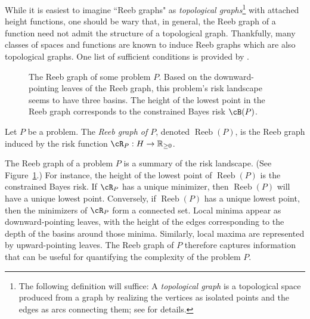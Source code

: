 \documentclass[twoside,11pt]{article}
\DeclareMathOperator{\reeb}{Reeb}
\begin{document}
    While it is easiest to imagine ``Reeb graphs" as \emph{topological graphs}\footnote{The following definition will suffice: A \emph{topological graph} is a topological space produced from a graph by realizing the vertices as isolated points and the edges as arcs connecting them; see \citep[Chapter 0]{hatcher2005algebraic} for details.} with attached height functions, one should be wary that, in general, the Reeb graph of a function need not admit the structure of a topological graph. Thankfully, many classes of spaces and functions are known to induce Reeb graphs which are also topological graphs. One list of sufficient conditions is provided by \citet[Example 2.2]{deSilva2016}.
   
    
    
    
   

    \begin{figure}
        \centering
        \caption{The Reeb graph of some problem $P$. Based on the downward-pointing leaves of the Reeb graph, this problem's risk landscape seems to have three basins. The height of the lowest point in the Reeb graph corresponds to the constrained Bayes risk $\cB(P)$.}\label{fig:problem-reeb-space}
    \end{figure}

    \begin{definition}
        Let $P$ be a problem. The \emph{Reeb graph of $P$}, denoted $\reeb(P)$, is the Reeb graph induced by the risk function $\cR_P:H\to \mathbb R_{\geq 0}$.
    \end{definition}

    The Reeb graph of a problem $P$ is a summary of the risk landscape. (See Figure~\ref{fig:problem-reeb-space}.) For instance, the height of the lowest point of $\reeb(P)$ is the constrained Bayes risk. If $\cR_P$ has a unique minimizer, then $\reeb(P)$ will have a unique lowest point. Conversely, if $\reeb(P)$ has a unique lowest point, then the minimizers of $\cR_P$ form a connected set. Local minima appear as downward-pointing leaves, with the height of the edges corresponding to the depth of the basins around those minima. Similarly, local maxima are represented by upward-pointing leaves. The Reeb graph of $P$  therefore captures information that can be useful for quantifying the complexity of the problem $P$.
\end{document}
